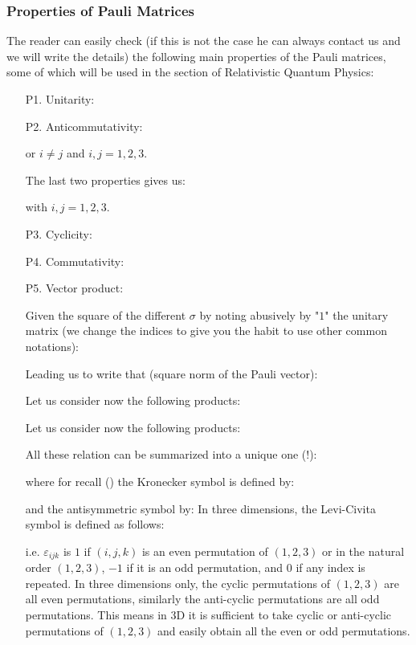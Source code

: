	\subsubsection{Properties of Pauli Matrices}
	The reader can easily check (if this is not the case he can always contact us and we will write the details) the following main properties of the Pauli matrices, some of which will be used in the section of Relativistic Quantum Physics:
	\begin{enumerate}
		\item[P1.] Unitarity:
		

		\item[P2.] Anticommutativity:
		
		or $i\neq j$ and $i,j=1,2,3$.

		The last two properties gives us:
		
		with $i,j=1,2,3$.

		\item[P3.] Cyclicity:
		

		\item[P4.] Commutativity:
		
		
		\item[P5.] Vector product:
		
		Given the square of the different $\sigma$ by noting abusively by "$1$" the unitary matrix (we change the indices to give you the habit to use other common notations):
		
		Leading us to write that (square norm of the Pauli vector):
		
		Let us consider now the following products:
		
		Let us consider now the following products:
		
		All these relation can be summarized into a unique one (!):
		
		where for recall () the Kronecker symbol is defined by:
		
		and the antisymmetric symbol by:
		In three dimensions, the Levi-Civita symbol is defined as follows:
		
		i.e.  $\varepsilon_{ijk}$  is $1$ if $(i, j, k)$ is an even permutation of $(1,2,3)$ or in the natural order $(1,2,3)$, $-1$ if it is an odd permutation, and $0$ if any index is repeated. In three dimensions only, the cyclic permutations of $(1,2,3)$ are all even permutations, similarly the anti-cyclic permutations are all odd permutations. This means in 3D it is sufficient to take cyclic or anti-cyclic permutations of $(1,2,3)$ and easily obtain all the even or odd permutations.
		

\end{enumerate}

